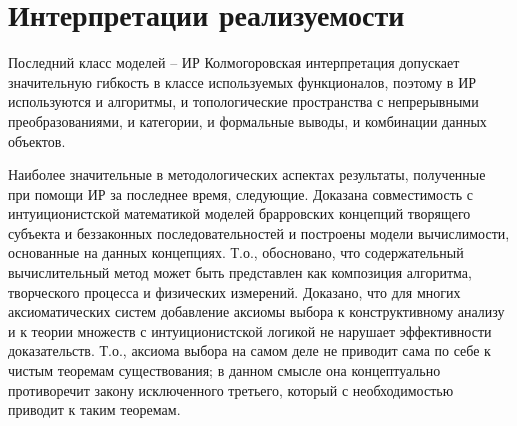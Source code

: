 \documentclass[12pt, a4paper]{article}
\begin{document}
\section{Интерпретации реализуемости}

Последний класс моделей – ИР Колмогоровская интерпретация допускает значительную гибкость в
классе используемых функционалов, поэтому в ИР используются и алгоритмы, и топологические
пространства с непрерывными преобразованиями, и категории, и формальные выводы, и комбинации
данных объектов.

Наиболее значительные в методологических аспектах результаты, полученные при помощи ИР за
последнее время, следующие. Доказана совместимость с интуиционистской математикой моделей
брарровских концепций творящего субъекта и беззаконных последовательностей 
и построены модели вычислимости, основанные на данных концепциях. Т.о., обосновано, что
содержательный вычислительный метод может быть представлен как композиция алгоритма,
творческого процесса и физических измерений. Доказано, что для многих аксиоматических систем
добавление аксиомы выбора к конструктивному анализу и к теории множеств с интуиционистской
логикой не нарушает эффективности доказательств. Т.о., аксиома выбора на самом деле не приводит
сама по себе к чистым теоремам существования; в данном смысле она концептуально противоречит
закону исключенного третьего, который с необходимостью приводит к таким теоремам.
\end{document}
